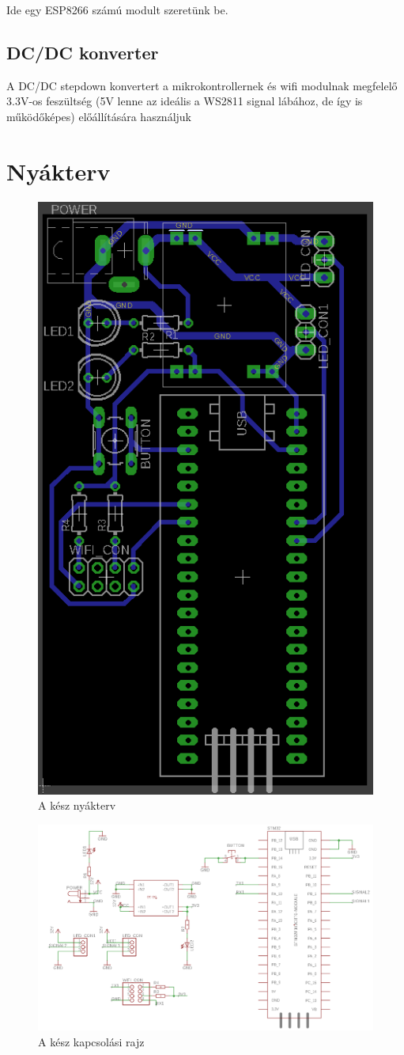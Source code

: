 \documentclass[12pt]{extarticle}
\begin{document}
	Ide egy ESP8266 számú modult szeretünk be.
	
	\subsection{DC/DC konverter}
	
	A DC/DC stepdown konvertert a mikrokontrollernek és wifi modulnak megfelelő 3.3V-os feszültség (5V lenne az ideális a WS2811 signal lábához, de így is működőképes) előállítására használjuk 
	
	\section{Nyákterv}
	
	
	\begin{figure}[h!]
		\centering
		\includegraphics[width=0.6\linewidth]{nyak.png}
		\caption{A kész nyákterv}
		\label{}
	\end{figure}

	\begin{figure}[h!]
		\centering
		\includegraphics[width=\linewidth]{nyak2.png}
		\caption{A kész kapcsolási rajz}
		\label{}
	\end{figure}
	
	
	
	
	
	
	
	
	
	
	
	
	
	
	
	
	
\end{document}
